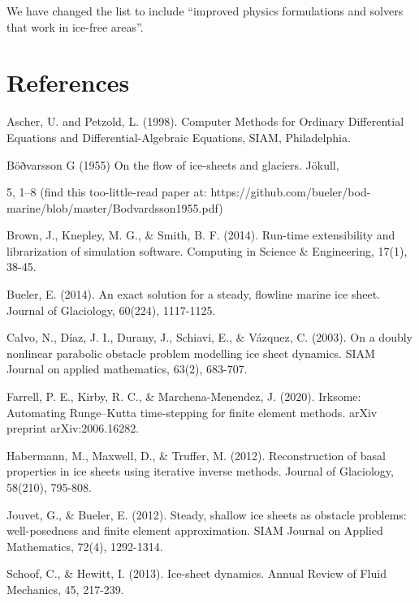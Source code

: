 \documentclass{article}
\theoremstyle{definition}
\theoremstyle{plain}
\begin{document}
We have changed the list to include ``improved physics formulations and solvers that work in ice-free areas''.

\section*{References}

Ascher, U. and Petzold, L. (1998). Computer Methods for Ordinary Differential Equations and Differential-Algebraic Equations, SIAM, Philadelphia.

Böðvarsson G (1955) On the flow of ice-sheets and glaciers. Jökull,

5, 1–8 (find this too-little-read paper at: https://github.com/bueler/bod-marine/blob/master/Bodvardsson1955.pdf)

Brown, J., Knepley, M. G., \& Smith, B. F. (2014). Run-time extensibility and librarization of simulation software. Computing in Science \& Engineering, 17(1), 38-45.

Bueler, E. (2014). An exact solution for a steady, flowline marine ice sheet. Journal of Glaciology, 60(224), 1117-1125.

Calvo, N., Díaz, J. I., Durany, J., Schiavi, E., \& Vázquez, C. (2003). On a doubly nonlinear parabolic obstacle problem modelling ice sheet dynamics. SIAM Journal on applied mathematics, 63(2), 683-707.

Farrell, P. E., Kirby, R. C., \& Marchena-Menendez, J. (2020). Irksome: Automating Runge--Kutta time-stepping for finite element methods. arXiv preprint arXiv:2006.16282.

Habermann, M., Maxwell, D., \& Truffer, M. (2012). Reconstruction of basal properties in ice sheets using iterative inverse methods. Journal of Glaciology, 58(210), 795-808.

Jouvet, G., \& Bueler, E. (2012). Steady, shallow ice sheets as obstacle problems: well-posedness and finite element approximation. SIAM Journal on Applied Mathematics, 72(4), 1292-1314.

Schoof, C., \& Hewitt, I. (2013). Ice-sheet dynamics. Annual Review of Fluid Mechanics, 45, 217-239.
\end{document}
